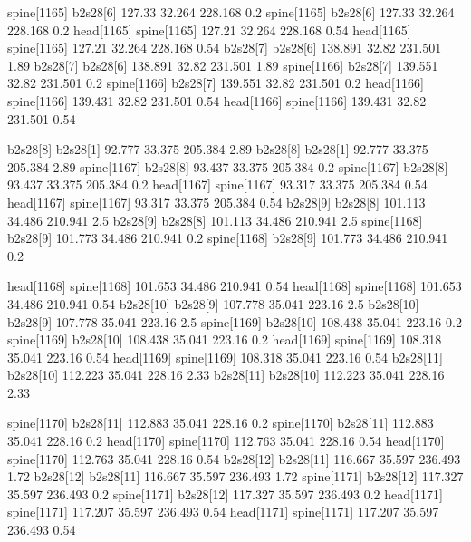 spine[1165]    b2s28[6]    127.33    32.264    228.168    0.2
spine[1165]    b2s28[6]    127.33    32.264    228.168    0.2
head[1165]    spine[1165]    127.21    32.264    228.168    0.54
head[1165]    spine[1165]    127.21    32.264    228.168    0.54
b2s28[7]    b2s28[6]    138.891    32.82    231.501    1.89
b2s28[7]    b2s28[6]    138.891    32.82    231.501    1.89
spine[1166]    b2s28[7]    139.551    32.82    231.501    0.2
spine[1166]    b2s28[7]    139.551    32.82    231.501    0.2
head[1166]    spine[1166]    139.431    32.82    231.501    0.54
head[1166]    spine[1166]    139.431    32.82    231.501    0.54


b2s28[8]    b2s28[1]    92.777    33.375    205.384    2.89
b2s28[8]    b2s28[1]    92.777    33.375    205.384    2.89
spine[1167]    b2s28[8]    93.437    33.375    205.384    0.2
spine[1167]    b2s28[8]    93.437    33.375    205.384    0.2
head[1167]    spine[1167]    93.317    33.375    205.384    0.54
head[1167]    spine[1167]    93.317    33.375    205.384    0.54
b2s28[9]    b2s28[8]    101.113    34.486    210.941    2.5
b2s28[9]    b2s28[8]    101.113    34.486    210.941    2.5
spine[1168]    b2s28[9]    101.773    34.486    210.941    0.2
spine[1168]    b2s28[9]    101.773    34.486    210.941    0.2


head[1168]    spine[1168]    101.653    34.486    210.941    0.54
head[1168]    spine[1168]    101.653    34.486    210.941    0.54
b2s28[10]    b2s28[9]    107.778    35.041    223.16    2.5
b2s28[10]    b2s28[9]    107.778    35.041    223.16    2.5
spine[1169]    b2s28[10]    108.438    35.041    223.16    0.2
spine[1169]    b2s28[10]    108.438    35.041    223.16    0.2
head[1169]    spine[1169]    108.318    35.041    223.16    0.54
head[1169]    spine[1169]    108.318    35.041    223.16    0.54
b2s28[11]    b2s28[10]    112.223    35.041    228.16    2.33
b2s28[11]    b2s28[10]    112.223    35.041    228.16    2.33


spine[1170]    b2s28[11]    112.883    35.041    228.16    0.2
spine[1170]    b2s28[11]    112.883    35.041    228.16    0.2
head[1170]    spine[1170]    112.763    35.041    228.16    0.54
head[1170]    spine[1170]    112.763    35.041    228.16    0.54
b2s28[12]    b2s28[11]    116.667    35.597    236.493    1.72
b2s28[12]    b2s28[11]    116.667    35.597    236.493    1.72
spine[1171]    b2s28[12]    117.327    35.597    236.493    0.2
spine[1171]    b2s28[12]    117.327    35.597    236.493    0.2
head[1171]    spine[1171]    117.207    35.597    236.493    0.54
head[1171]    spine[1171]    117.207    35.597    236.493    0.54


